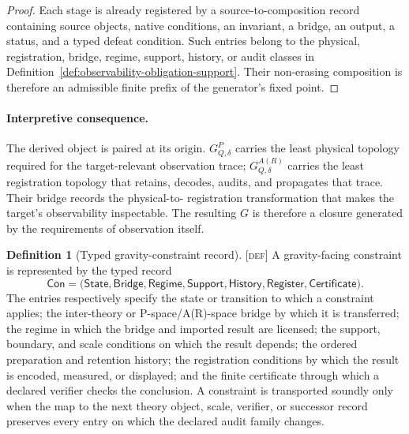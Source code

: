 \documentclass[11pt]{article}
\newcommand{\Defn}{\textsc{[def]}}
\theoremstyle{definition}
\newtheorem{sdefinition}{Definition}
\begin{document}
\begin{proof}
Each stage is already registered by a source-to-composition record containing
source objects, native conditions, an invariant, a bridge, an output, a status, and
a typed defeat condition. Such entries belong to the physical, registration,
bridge, regime, support, history, or audit classes in
Definition~\ref{def:observability-obligation-support}. Their non-erasing
composition is therefore an admissible finite prefix of the generator's fixed
point.
\end{proof}

\paragraph{Interpretive consequence.}
The derived object is paired at its origin. $G^P_{Q,\delta}$ carries the least
physical topology required for the target-relevant observation trace;
$G^{A(R)}_{Q,\delta}$ carries the least registration topology that retains,
decodes, audits, and propagates that trace. Their bridge records the physical-to-
registration transformation that makes the target's observability inspectable.
The resulting $G$ is therefore a closure generated by the requirements of
observation itself.

\begin{sdefinition}[Typed gravity-constraint record]
\label{def:typed-constraint-record}
\Defn{} A gravity-facing constraint is represented by the typed record
\begin{equation}
\mathsf{Con}=
\bigl(
\mathsf{State},\mathsf{Bridge},\mathsf{Regime},\mathsf{Support},
\mathsf{History},\mathsf{Register},\mathsf{Certificate}
\bigr).
\label{eq:typed-constraint-record}
\end{equation}
The entries respectively specify the state or transition to which a constraint
applies; the inter-theory or P-space/A(R)-space bridge by which it is transferred;
the regime in which the bridge and imported result are licensed; the support,
boundary, and scale conditions on which the result depends; the ordered preparation
and retention history; the registration conditions by which the result is encoded,
measured, or displayed; and the finite certificate through which a declared
verifier checks the conclusion. A constraint is transported soundly only when the
map to the next theory object, scale, verifier, or successor record preserves every
entry on which the declared audit family changes.
\end{sdefinition}
\end{document}
